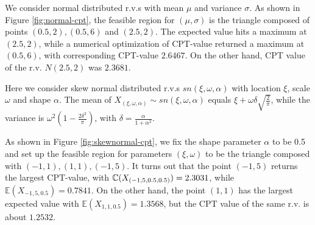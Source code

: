 \begin{example}
We consider normal distributed r.v.s with mean $\mu$ and variance $\sigma$. As shown in Figure \ref{fig:normal-cpt}, the feasible region for $(\mu, \sigma)$ is the triangle composed of points $(0.5,2), (0.5,6)$ and $(2.5,2)$. The expected value hits a maximum at $(2.5, 2)$, while a numerical optimization of CPT-value returned a maximum at $(0.5, 6)$, with corresponding CPT-value $2.6467$. On the other hand, CPT value of the r.v. $N(2.5, 2)$ was $2.3681$.
\end{example}

\begin{example}
Here we consider skew normal distributed r.v.s $sn(\xi, \omega, \alpha)$ with location $\xi$, scale $\omega$ and shape $\alpha$.  
The mean of $X_{(\xi, \omega, \alpha)} \sim sn(\xi, \omega, \alpha)$ equals 
$\xi + \omega \delta \sqrt{\frac{2}{\pi}}$, while the  variance is
$\omega^2(1 - \frac{2\delta^2}{\pi})$, with $\delta = \frac{\alpha}{1 + \alpha^2}$.

As shown in Figure \ref{fig:skewnormal-cpt}, we fix the shape parameter $\alpha$ to be 0.5 and set up the feasible region for parameters $(\xi, \omega)$ to be the triangle composed with $(-1,1), (1,1), (-1,5)$.  
It turns out that the point $(-1,5)$ returns the largest CPT-value, with $\mathbb{C}(X_{(-1,5,0.5,0.5)}) = 2.3031$, while
$\mathbb{E}(X_{-1,5,0.5}) = 0.7841$.
On the other hand, the point $(1,1)$ has the largest expected value with $\mathbb{E}(X_{1,1,0.5}) = 1.3568$, but the CPT value of the same r.v. is about $1.2532$.
\end{example}


